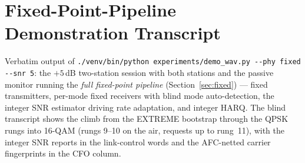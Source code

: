 \section{Fixed-Point-Pipeline Demonstration Transcript}
\label{app:fixeddemo}

Verbatim output of
\texttt{./venv/bin/python experiments/demo\_wav.py -{}-phy fixed
-{}-snr 5}: the $+5$\,dB two-station session with both stations and
the passive monitor running the \emph{full fixed-point pipeline}
(Section~\ref{sec:fixed}) --- fixed transmitters, per-mode fixed
receivers with blind mode auto-detection, the integer SNR estimator
driving rate adaptation, and integer HARQ.  The blind transcript shows
the climb from the EXTREME bootstrap through the QPSK rungs into
16-QAM (rungs 9--10 on the air, requests up to rung~11), with the
integer SNR reports in the link-control words and the AFC-netted
carrier fingerprints in the CFO column.


